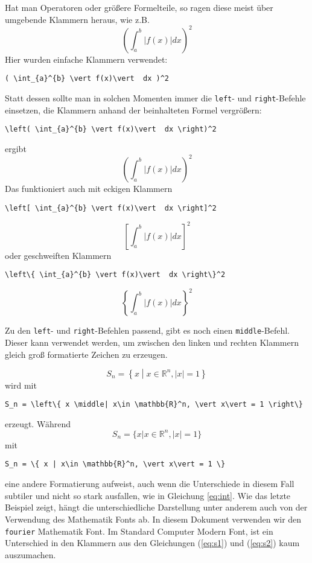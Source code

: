 Hat man Operatoren oder größere Formelteile, so ragen diese meist über umgebende Klammern heraus, wie z.B.
\begin{equation}\label{eq:int}
( \int_{a}^{b} \vert f(x)\vert  dx )^2
\end{equation}
Hier wurden einfache Klammern verwendet:
\begin{verbatim}
( \int_{a}^{b} \vert f(x)\vert  dx )^2
\end{verbatim}
Statt dessen sollte man in solchen Momenten immer die \texttt{left}- und \texttt{right}-Befehle einsetzen, die Klammern anhand der beinhalteten Formel vergrößern:

\begin{verbatim}
\left( \int_{a}^{b} \vert f(x)\vert  dx \right)^2
\end{verbatim}
ergibt
\begin{equation*}
\left( \int_{a}^{b} \vert f(x)\vert  dx \right)^2
\end{equation*}
Das funktioniert auch mit eckigen Klammern
\begin{verbatim}
\left[ \int_{a}^{b} \vert f(x)\vert  dx \right]^2
\end{verbatim}
\begin{equation*}
\left[ \int_{a}^{b} \vert f(x)\vert  dx \right]^2
\end{equation*}
oder geschweiften Klammern
\begin{verbatim}
\left\{ \int_{a}^{b} \vert f(x)\vert  dx \right\}^2
\end{verbatim}
\begin{equation*}
\left\{ \int_{a}^{b} \vert f(x)\vert  dx \right\}^2
\end{equation*}

Zu den \texttt{left}- und \texttt{right}-Befehlen passend, gibt es noch einen \texttt{middle}-Befehl. Dieser kann verwendet werden, um zwischen den linken und rechten Klammern gleich groß formatierte Zeichen zu erzeugen.

\begin{equation}\label{eq:s1}
S_n = \left\{ x \middle| x\in \mathbb{R}^n, \vert x\vert = 1 \right\}
\end{equation}
wird mit 
\begin{verbatim}
S_n = \left\{ x \middle| x\in \mathbb{R}^n, \vert x\vert = 1 \right\}
\end{verbatim}
erzeugt. Während 
\begin{equation}\label{eq:s2}
S_n = \{ x | x\in \mathbb{R}^n, \vert x\vert = 1 \}
\end{equation}
mit
\begin{verbatim}
S_n = \{ x | x\in \mathbb{R}^n, \vert x\vert = 1 \}
\end{verbatim}
eine andere Formatierung aufweist, auch wenn die Unterschiede in diesem Fall subtiler und nicht so stark ausfallen, wie in Gleichung \ref{eq:int}. Wie das letzte Beispiel zeigt, hängt die unterschiedliche Darstellung unter anderem auch von der Verwendung des Mathematik Fonts ab. In diesem Dokument verwenden wir den \texttt{fourier} Mathematik Font. Im Standard Computer Modern Font, ist ein Unterschied in den Klammern aus den Gleichungen (\ref{eq:s1}) und (\ref{eq:s2}) kaum auszumachen. 

